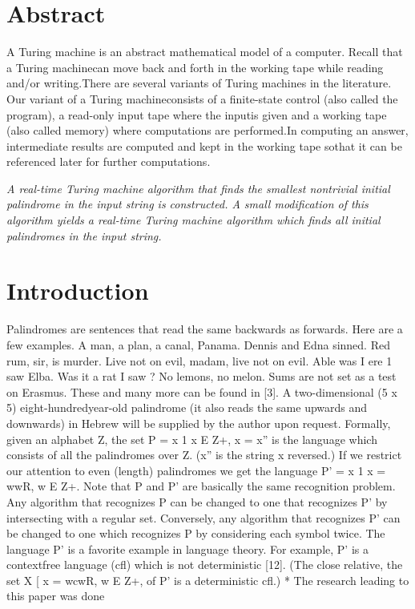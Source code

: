 \documentclass[11pt,a4paper]{report}
\begin{document}
\chapter*{Abstract}

A Turing machine is an abstract mathematical model of a computer. Recall that a Turing machinecan move back and forth in the working tape while reading and/or writing.There are several variants of Turing machines in the literature. Our variant of a Turing machineconsists of a finite-state control (also called the program), a read-only input tape where the inputis given and a working tape (also called memory) where computations are performed.In computing an answer, intermediate results are computed and kept in the working tape sothat it can be referenced later for further computations.

\vspace{5pt}
\textit{A real-time Turing machine algorithm that finds the smallest nontrivial initial palindrome in the input string is constructed. A small modification of this algorithm yields
a real-time Turing machine algorithm which finds all initial palindromes in the input
string. 
}


\pagestyle{plain}

\chapter{Introduction}
Palindromes are sentences that read the same backwards as forwards. Here are a few
examples.
A man, a plan, a canal, Panama.
Dennis and Edna sinned.
Red rum, sir, is murder.
Live not on evil, madam, live not on evil.
Able was I ere 1 saw Elba.
Was it a rat I saw ?
No lemons, no melon.
Sums are not set as a test on Erasmus.
These and many more can be found in [3]. A two-dimensional (5 x 5) eight-hundredyear-old palindrome (it also reads the same upwards and downwards) in Hebrew will
be supplied by the author upon request.
Formally, given an alphabet Z, the set P = {x 1 x E Z+, x = x”} is the language
which consists of all the palindromes over Z. (x” is the string x reversed.) If we restrict
our attention to even (length) palindromes we get the language P’ = {x 1 x = wwR,
w E Z+}. Note that P and P’ are basically the same recognition problem. Any algorithm
that recognizes P can be changed to one that recognizes P’ by intersecting with a regular
set. Conversely, any algorithm that recognizes P’ can be changed to one which recognizes
P by considering each symbol twice.
The language P’ is a favorite example in language theory. For example, P’ is a contextfree language (cfl) which is not deterministic [12]. (The close relative, the set {X [ x =
wcwR, w E Z+}, of P’ is a deterministic cfl.)
* The research leading to this paper was done 
\vspace{5pt}
\end{document}
